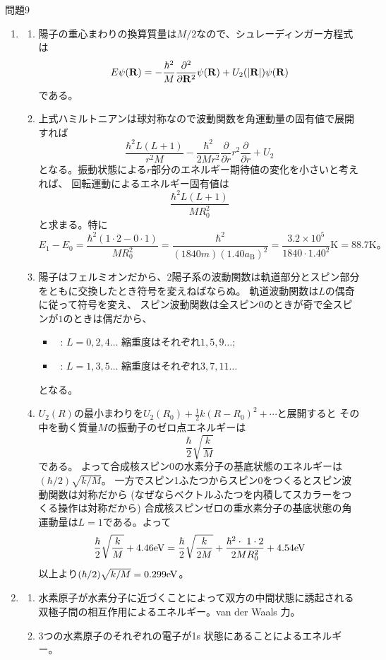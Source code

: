 \documentclass[fleqn]{jbook}
\begin{document}
\begin{answer}{問題9}{}
\begin{enumerate}
\item 
\begin{enumerate}
\item 陽子の重心まわりの換算質量は$M/2$なので、シュレーディンガー方程式は\[
E\psi(\mathbf R)=-\frac{\hbar^2}{M}\frac{\partial^2}{\partial\mathbf R^2}\psi(\mathbf R)+U_2(|\mathbf R|)\psi(\mathbf R)
\]である。
\item 上式ハミルトニアンは球対称なので波動関数を角運動量の固有値で展開すれば\[
\frac{\hbar^2 L(L+1)}{r^2 M}-\frac{\hbar^2}{2Mr^2}\frac{\partial}{\partial r}
r^2\frac{\partial}{\partial r}+U_2
\]となる。振動状態による$r$部分のエネルギー期待値の変化を小さいと考えれば、
回転運動によるエネルギー固有値は\[
\frac{\hbar^2 L(L+1)}{MR_0^2}
\]と求まる。特に\[
E_1-E_0=\frac{\hbar^2 (1\cdot 2-0\cdot 1)}{MR_0^2 }
=\frac{\hbar^2}{ (1840 m) (1.40a_{\mathrm{B}})^2}
=\frac{3.2\times 10^5}{1840\cdot 1.40^2}\mathrm{K}
=88.7\mathrm{K}。
\]
\item 陽子はフェルミオンだから、2陽子系の波動関数は軌道部分とスピン部分をともに交換したとき符号を変えねばならぬ。
軌道波動関数は$L$の偶奇に従って符号を変え、
スピン波動関数は全スピン$0$のときが奇で全スピンが$1$のときは偶だから、
\begin{itemize}
\item \ \para: $L=0,2,4\ldots$ 縮重度はそれぞれ$1,5,9\ldots$;
\item \ \ortho: $L=1,3,5\ldots$ 縮重度はそれぞれ$3,7,11\ldots$
\end{itemize}となる。
\item $U_2(R)$の最小まわりを$U_2(R_0)+\frac12k(R-R_0)^2+\cdots$と展開すると
その中を動く質量$M$の振動子のゼロ点エネルギーは\[
\frac\hbar2\sqrt{\frac{k}{M}}
\]である。
よって合成核スピン0の水素分子の基底状態のエネルギーは$(\hbar/2)\sqrt{k/M}$。
一方でスピン1ふたつからスピン0をつくるとスピン波動関数は対称だから
(なぜならベクトルふたつを内積してスカラーをつくる操作は対称だから)
合成核スピンゼロの重水素分子の基底状態の角運動量は$L=1$である。よって\[
\frac\hbar2\sqrt{\frac{k}{M}}+4.46\mathrm{eV}
=\frac\hbar2\sqrt{\frac{k}{2M}}+\frac{\hbar^2\cdot\  1\cdot 2}{2MR_0^2}+4.54\mathrm{eV}
\]以上より$(\hbar/2)\sqrt{k/M}=0.299\mathrm{eV}$。
\end{enumerate}
\item 
\begin{enumerate}
\item 水素原子が水素分子に近づくことによって双方の中間状態に誘起される双極子間の相互作用によるエネルギー。van der Waals 力。
\item 3つの水素原子のそれぞれの電子が1s 状態にあることによるエネルギー。

\end{enumerate}
\end{enumerate}
\end{answer}
\end{document}
